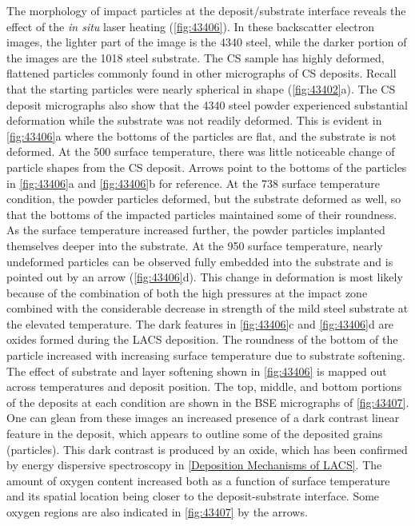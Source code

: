 The morphology of impact particles at the deposit/substrate interface reveals the effect of the \textit{in situ} laser heating (\ref{fig:43406}). In these backscatter electron images, the lighter part of the image is the 4340 steel, while the darker portion of the images are the 1018 steel substrate. The CS sample has highly deformed, flattened particles commonly found in other micrographs of CS deposits. Recall that the starting particles were nearly spherical in shape (\ref{fig:43402}a). The CS deposit micrographs also show that the 4340 steel powder experienced substantial deformation while the substrate was not readily deformed. This is evident in \ref{fig:43406}a where the bottoms of the particles are flat, and the substrate is not deformed. At the 500 \celsius{} surface temperature, there was little noticeable change of particle shapes from the CS deposit. Arrows point to the bottoms of the particles in \ref{fig:43406}a and \ref{fig:43406}b for reference. At the 738 \celsius{} surface temperature condition, the powder particles deformed, but the substrate deformed as well, so that the bottoms of the impacted particles maintained some of their roundness. As the surface temperature increased further, the powder particles implanted themselves deeper into the substrate. At the 950 \celsius{} surface temperature, nearly undeformed particles can be observed fully embedded into the substrate and is pointed out by an arrow (\ref{fig:43406}d). This change in deformation is most likely because of the combination of both the high pressures at the impact zone \cite{RN1395} combined with the considerable decrease in strength of the mild steel substrate at the elevated temperature. The dark features in \ref{fig:43406}c and \ref{fig:43406}d are oxides formed during the LACS deposition. The roundness of the bottom of the particle increased with increasing surface temperature due to substrate softening. The effect of substrate and layer softening shown in \ref{fig:43406} is mapped out across temperatures and deposit position. The top, middle, and bottom portions of the deposits at each condition are shown in the BSE micrographs of \ref{fig:43407}. One can glean from these images an increased presence of a dark contrast linear feature in the deposit, which appears to outline some of the deposited grains (particles). This dark contrast is produced by an oxide, which has been confirmed by energy dispersive spectroscopy in \ref{Deposition Mechanisms of LACS}. The amount of oxygen content increased both as a function of surface temperature and its spatial location being closer to the deposit-substrate interface. Some oxygen regions are also indicated in \ref{fig:43407} by the arrows.


